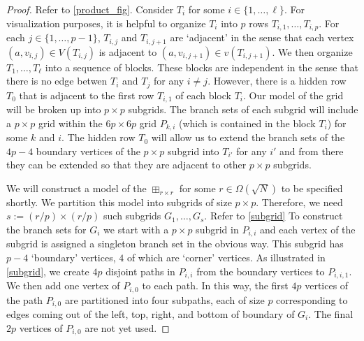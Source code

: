 \documentclass[kpfonts,lotsofwhite]{patmorin}
\theoremstyle{plain}
\theoremstyle{definition}
\begin{document}
\begin{proof}
  Refer to \cref{product_fig}.
  Consider $T_i$ for some $i\in\{1,\ldots,\ell\}$. For visualization purposes, it is helpful to organize $T_i$ into $p$ rows $T_{i,1},\ldots,T_{i,p}$.  For each $j\in\{1,\ldots,p-1\}$, $T_{i,j}$ and $T_{i,j+1}$ are `adjacent' in the sense that each vertex $(a,v_{i,j})\in V(T_{i,j})$ is adjacent to $(a,v_{i,j+1})\in v(T_{i,j+1})$.  We then organize $T_1,\ldots,T_{\ell}$ into a sequence of blocks. These blocks are independent in the sense that there is no edge betwen $T_{i}$ and $T_j$ for any $i\neq j$.  However, there is a hidden row $T_0$ that is adjacent to the first row $T_{i,1}$ of each block $T_i$. Our model of the grid will be broken up into $p\times p$ subgrids. The branch sets of each subgrid will include a $p\times p$ grid within the $6p\times 6p$ grid $P_{k,i}$ (which is contained in the block $T_i$) for some $k$ and $i$.  The hidden row $T_0$ will allow us to extend the branch sets of the $4p-4$ boundary vertices of the $p\times p$ subgrid into $T_{i'}$ for any $i'$ and from there they can be extended so that they are adjacent to other $p\times p$ subgrids.

  We will construct a model of the $\boxplus_{r\times r}$ for some $r\in \Omega(\sqrt{N})$ to be specified shortly.  We partition this model into subgrids of size $p\times p$.  Therefore, we need $s:=(r/p)\times (r/p)$ such subgrids $G_1,\ldots,G_s$.  Refer to \cref{subgrid}   To construct the branch sets for $G_i$ we start with a $p\times p$ subgrid in $P_{i,i}$ and each vertex of the subgrid is assigned a singleton branch set in the obvious way.  This subgrid has $p-4$ `boundary' vertices, $4$ of which are `corner' vertices. As illustrated in \cref{subgrid}, we create $4p$ disjoint paths in $P_{i,i}$ from the boundary vertices to $P_{i,i,1}$.  We then add one vertex of $P_{i,0}$ to each path.  In this way, the first $4p$ vertices of the path $P_{i,0}$ are partitioned into four subpaths, each of size $p$ corresponding to edges coming out of the left, top, right, and bottom of boundary of $G_i$.  The final $2p$ vertices of $P_{i,0}$ are not yet used.


\end{proof}
\end{document}
